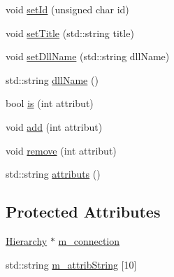 \begin{DoxyCompactItemize}
\item 
void \hyperlink{classObject_a398fe08cba594a0ce6891d59fe4f159f}{setId} (unsigned char id)
\item 
void \hyperlink{classObject_a89557dbbad5bcaa02652f5d7fa35d20f}{setTitle} (std::string title)
\item 
void \hyperlink{classObject_a870c5af919958c2136623b2d7816d123}{setDllName} (std::string dllName)
\item 
std::string \hyperlink{classObject_a2e3947f2870094c332d7454117f3ec63}{dllName} ()
\item 
bool \hyperlink{classAttrib_a704f26af560909ad22065083bb7d4c34}{is} (int attribut)
\item 
void \hyperlink{classAttrib_a235f773af19c900264a190b00a3b4ad7}{add} (int attribut)
\item 
void \hyperlink{classAttrib_a7d4ef7e32d93cb287792b87b857e79f3}{remove} (int attribut)
\item 
std::string \hyperlink{classAttrib_aee7bbf16b144887f196e1341b24f8a26}{attributs} ()
\end{DoxyCompactItemize}
\subsection*{Protected Attributes}
\begin{DoxyCompactItemize}
\item 
\hyperlink{classHierarchy}{Hierarchy} $\ast$ \hyperlink{classElement_abe3de7a5dbbc9a6dd2d7e012e5fdb266}{m\_\-connection}
\item 
std::string \hyperlink{classAttrib_a3414521d7a82476e874b25a5407b5e63}{m\_\-attribString} \mbox{[}10\mbox{]}
\end{DoxyCompactItemize}

